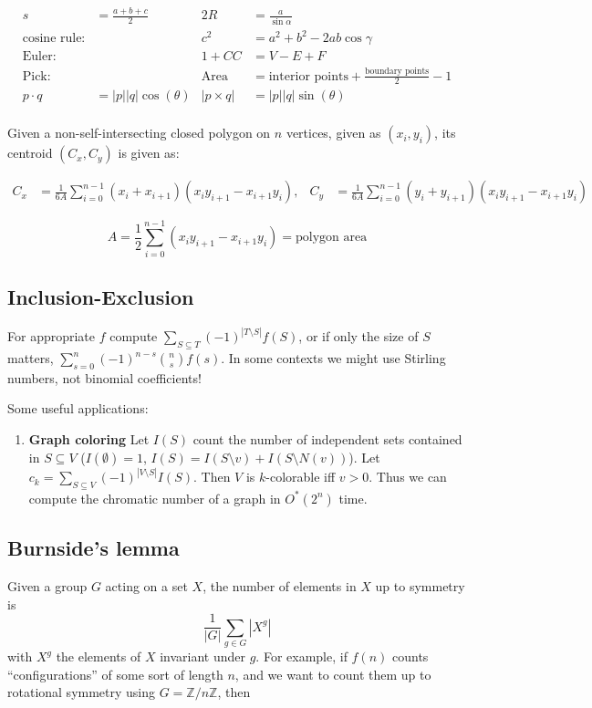 \documentclass[
	a4paper,
	landscape,
	10pt,
]{article}
\begin{document}
		\begin{align*}
			s &= \frac {a+b+c}2 & 2R &=\frac{a}{\sin \alpha}\\
			\textrm{cosine rule:}&&  c^2 &= a^2 + b^2 - 2ab\cos \gamma\\
			\textrm{Euler:}&&  1 + CC &= V - E + F\\
			\textrm{Pick:}&& \textrm{Area} &= \textrm{interior points}
			+ \frac{\textrm{boundary points}}2 - 1\\
			p\cdot q &= |p||q|\cos(\theta) & |p\times q| &= |p||q|\sin(\theta)\\
		\end{align*}

		Given a non-self-intersecting closed polygon on $n$ vertices, given as $(x_i, y_i)$, its centroid $(C_x, C_y)$ is given as:

		\begin{align*}
			C_x &= \frac{1}{6A} \sum_{i = 0}^{n - 1} (x_i + x_{i+1}) (x_i y_{i+1} - x_{i+1} y_i), &
			C_y &= \frac{1}{6A} \sum_{i = 0}^{n - 1} (y_i + y_{i+1}) (x_i y_{i+1} - x_{i+1} y_i)
		\end{align*}

		\begin{equation*}
			A = \frac{1}{2} \sum_{i = 0}^{n - 1} (x_i y_{i+1} - x_{i+1} y_i) = \textrm{polygon area}
		\end{equation*}

		\subsection*{Inclusion-Exclusion}
		For appropriate $f$ compute $\sum_{S\subseteq T} (-1)^{|T\setminus S|} f(S)$,
		or if only the size of $S$ matters, $\sum_{s=0}^n (-1)^{n-s} \binom{n}{s}f(s)$.
		In some contexts we might use Stirling numbers, not binomial coefficients!

		Some useful applications:
		\begin{enumerate}
			\item[] \textbf{Graph coloring} Let $I(S)$ count the number
				of independent sets
				contained in $S \subseteq V$ ($I(\emptyset) = 1$,
				$I(S) = I(S\setminus v) + I(S\setminus N(v))$). Let
				$c_k = \sum_{S\subseteq V} (-1)^{|V\setminus S|} I(S)$. Then $V$
				is $k$-colorable iff $v > 0$. Thus we can compute the chromatic
				number of a graph in $O^*(2^n)$ time.
		\end{enumerate}

		\subsection*{Burnside's lemma}
		Given a group $G$ acting on a set $X$, the number of elements in $X$ up to
		symmetry is $$\frac{1}{|G|}\sum_{g\in G} |X^g|$$ with $X^g$ the elements of
		$X$ invariant under $g$. For example, if $f(n)$ counts ``configurations''
		of some sort of length $n$, and we want to count them up to rotational symmetry
		using $G = \mathbb{Z}/n\mathbb{Z}$, then
\end{document}
